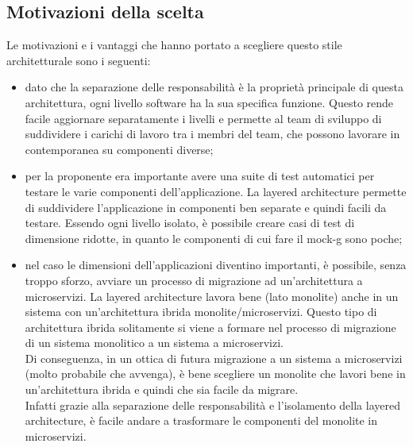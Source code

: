 \subsection{Motivazioni della scelta}
Le motivazioni e i vantaggi che hanno portato a scegliere questo stile architetturale sono i seguenti:
\begin{itemize}
    \item dato che la separazione delle responsabilità è la proprietà principale di questa architettura,
        ogni livello software ha la sua specifica funzione. Questo rende facile aggiornare 
        separatamente i livelli e permette al team di sviluppo di suddividere i carichi di lavoro tra i 
        membri del team, che possono lavorare in contemporanea su componenti diverse;
    \item per la proponente era importante avere una suite di test automatici per testare le varie componenti
        dell'applicazione. La layered architecture
        permette di suddividere l'applicazione in componenti ben separate e quindi facili da testare.
        Essendo ogni livello isolato, è possibile creare casi di test di dimensione ridotte, 
        in quanto le componenti di cui fare il \gls{mock-g} sono poche;
    \item nel caso le dimensioni dell'applicazioni diventino importanti, è possibile, senza troppo sforzo, avviare un processo
        di migrazione ad un'architettura a microservizi. La layered architecture lavora bene (lato monolite) anche
        in un sistema con un'architettura ibrida monolite/microservizi. Questo tipo di architettura
        ibrida solitamente si viene a formare nel processo di migrazione di un sistema monolitico a un sistema a microservizi.
        \\
        Di conseguenza, in un ottica di futura migrazione a un sistema a microservizi (molto probabile che avvenga), è
        bene scegliere un monolite che lavori bene in un'architettura ibrida e quindi che sia facile da migrare.
        \\
        Infatti grazie alla separazione delle responsabilità e l'isolamento della layered architecture, è facile andare
        a trasformare le componenti del monolite in microservizi.
\end{itemize}
\clearpage
